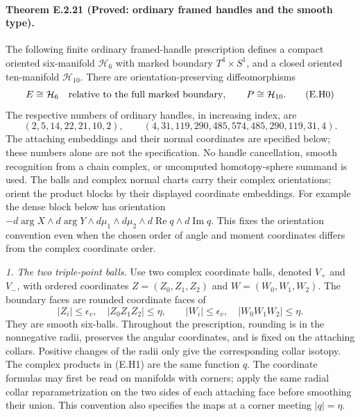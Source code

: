 \paragraph{Theorem E.2.21 (Proved: ordinary framed handles and the smooth type).}
The following finite ordinary framed-handle prescription defines a
compact oriented six-manifold $\mathcal H_6$ with marked boundary
$T^4\times S^1$, and a closed oriented ten-manifold $\mathcal H_{10}$.
There are orientation-preserving diffeomorphisms
\[
 E\cong\mathcal H_6\quad\hbox{relative to the full marked boundary},
 \qquad P\cong\mathcal H_{10}.
 \tag{E.H0}
\]
The respective numbers of ordinary handles, in increasing index, are
\[
 (2,5,14,22,21,10,2),\qquad
 (4,31,119,290,485,574,485,290,119,31,4).
\]
The attaching embeddings and their normal coordinates are specified
below; these numbers alone are not the specification.  No handle
cancellation, smooth recognition from a chain complex, or uncomputed
homotopy-sphere summand is used.
The balls and complex normal charts carry their complex orientations;
orient the product blocks by their displayed coordinate embeddings.
For example the dense block below has orientation
$-d\arg X\wedge d\arg Y\wedge d\mu_1\wedge d\mu_2
\wedge d\operatorname{Re}q\wedge d\operatorname{Im}q$.
This fixes the orientation convention even when the chosen order of
angle and moment coordinates differs from the complex coordinate order.

\emph{1. The two triple-point balls.}
Use two complex coordinate balls, denoted $V_+$ and $V_-$, with
ordered coordinates $Z=(Z_0,Z_1,Z_2)$ and $W=(W_0,W_1,W_2)$.
The boundary faces are rounded coordinate faces of
\[
 |Z_i|\leq\epsilon_v,\quad |Z_0Z_1Z_2|\leq\eta,
 \qquad
 |W_i|\leq\epsilon_v,\quad |W_0W_1W_2|\leq\eta.
 \tag{E.H1}
\]
They are smooth six-balls.  Throughout the prescription, rounding is
in the nonnegative radii, preserves the angular coordinates, and is
fixed on the attaching collars.  Positive changes of the radii only
give the corresponding collar isotopy.  The complex products in
(E.H1) are the same function $q$.
The coordinate formulas may first be read on manifolds with corners;
apply the same radial collar reparametrization on the two sides of
each attaching face before smoothing their union.  This convention
also specifies the maps at a corner meeting $|q|=\eta$.

